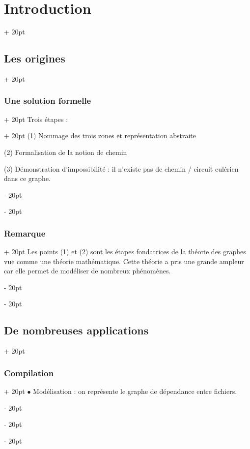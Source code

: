 \documentclass[a4paper, 12pt, twoside]{article}
\newcommand{\ind}[1][20pt]{\advance\leftskip + #1}
\newcommand{\deind}[1][20pt]{\advance\leftskip - #1}
\newenvironment{indt}[2][20pt]{#2 \par \ind[#1]}{\par \deind} %
\begin{document}
\begin{indt}{\section{Introduction}}
\begin{indt}{\subsection{Les origines}}
\begin{indt}{\subsubsection{Une solution formelle}}
                \begin{indt}{Trois étapes :}
                    (1) Nommage des trois zones et représentation abstraite

                    \begin{center}
                    \end{center}

                    (2) Formalisation de la notion de chemin

                    (3) Démonstration d'impossibilité : il n'existe pas de chemin / circuit eulérien dans ce graphe.
                \end{indt}
            \end{indt}

            \vspace{12pt}
            
            \begin{indt}{\subsubsection{Remarque}}
                Les points (1) et (2) sont les étapes fondatrices de la théorie des graphes vue comme une théorie mathématique.
                Cette théorie a pris une grande ampleur car elle permet de modéliser de nombreux phénomènes.
            \end{indt}
        \end{indt}

        \vspace{12pt}
        
        \begin{indt}{\subsection{De nombreuses applications}}
            \begin{indt}{\subsubsection{Compilation}}
                $\bullet$ Modélisation : on représente le graphe de dépendance entre fichiers.


\end{indt}
\end{indt}
\end{indt}
\end{document}
